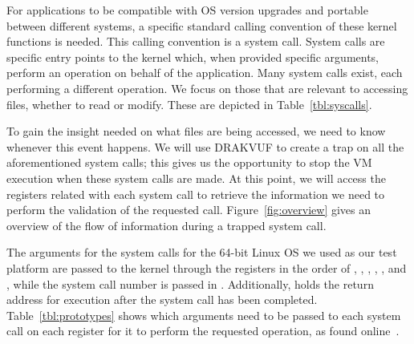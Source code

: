 \par For applications to be compatible with \ac{OS} version upgrades and portable between different systems, a specific standard calling convention of these kernel functions is needed. This calling convention is a system call. System calls are specific entry points to the kernel which, when provided specific arguments, perform an operation on behalf of the application. Many system calls exist, each performing a different operation. We focus on those that are relevant to accessing files, whether to read or modify. These are depicted in Table~\ref{tbl:syscalls}.

\par To gain the insight needed on what files are being accessed, we need to know whenever this event happens. We will use DRAKVUF to create a trap on all the aforementioned system calls; this gives us the opportunity to stop the \ac{VM} execution when these system calls are made. At this point, we will access the registers related with each system call to retrieve the information we need to perform the validation of the requested call. Figure~\ref{fig:overview} gives an overview of the flow of information during a trapped system call. 

\par The arguments for the system calls for the 64-bit Linux \ac{OS} we used as our test platform are passed to the kernel through the registers in the order of , , , , , and , while the system call number is passed in . Additionally,  holds the return address for execution after the system call has been completed. Table~\ref{tbl:prototypes} shows which arguments need to be passed to each system call on each register for it to perform the requested operation, as found online~\cite{syscalls}.

